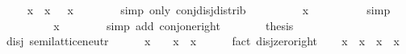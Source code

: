 \begin{isabellebody}
\ \isamarkupfalse%
\ {\isachardoublequoteopen}{\isasymdots}\ {\isacharequal}{\kern0pt}\ x\ \isactrlbold {\isasymsqinter}\ {\isacharparenleft}{\kern0pt}x\ \isactrlbold {\isasymsqunion}\ \isactrlbold {\isacharminus}{\kern0pt}\ x{\isacharparenright}{\kern0pt}{\isachardoublequoteclose}\isanewline
\ \ \ \ \ \ \isamarkupfalse%
\ {\isacharparenleft}{\kern0pt}simp\ only{\isacharcolon}{\kern0pt}\ conj{\isacharunderscore}{\kern0pt}disj{\isacharunderscore}{\kern0pt}distrib{\isacharparenright}{\kern0pt}\isanewline
\ \ \ \ \isamarkupfalse%
\ \isamarkupfalse%
\ {\isachardoublequoteopen}{\isasymdots}\ {\isacharequal}{\kern0pt}\ x\ \isactrlbold {\isasymsqinter}\ \isanewline
\ \ \ \ \ \ \isamarkupfalse%
\ simp\isanewline
\ \ \ \ \isamarkupfalse%
\ \isamarkupfalse%
\ {\isachardoublequoteopen}{\isasymdots}\ {\isacharequal}{\kern0pt}\ x{\isachardoublequoteclose}\isanewline
\ \ \ \ \ \ \isamarkupfalse%
\ {\isacharparenleft}{\kern0pt}simp\ add{\isacharcolon}{\kern0pt}\ conj{\isacharunderscore}{\kern0pt}one{\isacharunderscore}{\kern0pt}right{\isacharparenright}{\kern0pt}\isanewline
\ \ \ \ \isamarkupfalse%
\ \isamarkupfalse%
\ {\isacharquery}{\kern0pt}thesis\ \isacommand{{\isachardot}{\kern0pt}}\isamarkupfalse%
\isanewline
\ \ \isamarkupfalse%
\isanewline
{}\isamarkupfalse%
%
\endisatagproof
{\isafoldproof}%
%
\isadelimproof
\isanewline
%
\endisadelimproof
\isanewline
{}\isamarkupfalse%
\ disj{\isacharcolon}{\kern0pt}\ semilattice{\isacharunderscore}{\kern0pt}neutr\ {\isacartoucheopen}{\isacharparenleft}{\kern0pt}\isactrlbold {\isasymsqunion}{\isacharparenright}{\kern0pt}{\isacartoucheclose}\ {\isacartoucheopen}\isanewline
%
\isadelimproof
%
\endisadelimproof
%
\isatagproof
{}\isamarkupfalse%
\isanewline
\ \ \isamarkupfalse%
\ {\isachardoublequoteopen}x\ \isactrlbold {\isasymsqunion}\ \ {\isacharequal}{\kern0pt}\ x{\isachardoublequoteclose}\ \ x\isanewline
\ \ \ \ \isamarkupfalse%
\ {\isacharparenleft}{\kern0pt}fact\ disj{\isacharunderscore}{\kern0pt}zero{\isacharunderscore}{\kern0pt}right{\isacharparenright}{\kern0pt}\isanewline
\ \ \isamarkupfalse%
\ {\isachardoublequoteopen}x\ \isactrlbold {\isasymsqunion}\ x\ {\isacharequal}{\kern0pt}\ x{\isachardoublequoteclose}\ \ x\isanewline

\end{isabellebody}
